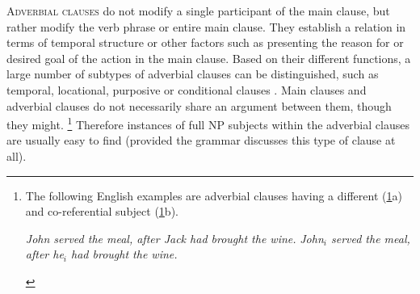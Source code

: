 \textsc{Adverbial clauses} do not modify a single participant of the main clause, but rather modify the verb phrase or entire main clause. 
They establish a relation in terms of temporal structure or other factors such as presenting the reason for or desired goal of the action in the main clause. 
Based on their different functions, a large number of subtypes of adverbial clauses can be distinguished, such as temporal, locational, purposive or conditional clauses \citep[for a discussion of these different subtypes see][243--265]{Adverbial}. 
Main clauses and adverbial clauses do not necessarily share an argument between them, though they might.
\enlargethispage{\baselineskip}
\footnote{The following English examples are adverbial clauses having a different (\ref{EngAdvCl}a) and co-referential subject (\ref{EngAdvCl}b).

\begin{exe}
\ex\label{EngAdvCl}
\begin{xlist}\ex \textit{John served the meal, after Jack had brought the wine.}
\ex \textit{John$_i$ served the meal, after he$_i$ had brought the wine.}
\end{xlist}
\end{exe}} 
Therefore instances of full NP subjects within the adverbial clauses are usually easy to find (provided the grammar discusses this type of clause at all). 

